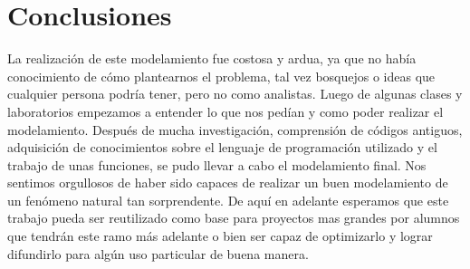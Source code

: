 \documentclass[journal]{IEEEtran}
\begin{document}
\section{Conclusiones}

La realización de este modelamiento fue costosa y ardua, ya que no había conocimiento de cómo plantearnos el problema, tal vez bosquejos o ideas que cualquier persona podría tener, pero no como analistas. Luego de algunas clases y laboratorios empezamos a entender lo que nos pedían y como poder realizar el modelamiento. Después de mucha investigación, comprensión de códigos antiguos, adquisición de conocimientos sobre el lenguaje de programación utilizado y el trabajo de unas funciones, se pudo llevar a cabo el modelamiento final. Nos sentimos orgullosos de haber sido capaces de realizar un buen modelamiento de un fenómeno natural tan sorprendente. De aquí en adelante esperamos que este trabajo pueda ser reutilizado como base para proyectos mas grandes por alumnos que tendrán este ramo más adelante o bien ser capaz de optimizarlo y lograr difundirlo para algún uso particular de buena manera.



\end{document}
